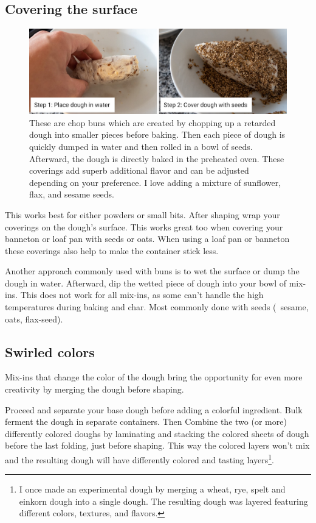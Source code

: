 \subsection{Covering the surface}

\begin{figure}[htb!]
  \centering
  \includegraphics[width=\textwidth]{surface-seeds}
  \caption[Surface seeds]{These are chop buns which are created by chopping
    up a retarded dough into smaller pieces before baking. Then each piece of
    dough is quickly dumped in water and then rolled in a bowl of seeds.
    Afterward, the dough is directly baked in the preheated oven. These
    coverings add superb additional flavor and can be adjusted depending on
    your preference. I love adding a mixture of sunflower, flax, and
    sesame seeds.}%
  \label{fig:surface-seeds}
\end{figure}

This works best for either powders or small bits. After shaping wrap your
coverings on the dough's surface. This works great too when covering your
banneton or loaf pan with seeds or oats. When using a loaf pan or banneton
these coverings also help to make the container stick less.

Another approach commonly used with buns is to wet the surface or dump the
dough in water. Afterward, dip the wetted piece of dough into your bowl of
mix-ins.  This does not work for all mix-ins, as some can't handle the high
temperatures during baking and char. Most commonly done with seeds
(\eg~sesame, oats, flax-seed).

\subsection{Swirled colors}
Mix-ins that change the color of the dough bring the opportunity for even more
creativity by merging the dough before shaping.

Proceed and separate your base dough before adding a colorful ingredient. Bulk
ferment the dough in separate containers. Then Combine the two (or
more) differently colored doughs by laminating and stacking the colored sheets
of dough before the last folding, just before shaping. This way the colored
layers won't mix and the resulting dough will have differently colored and
tasting layers\footnote{I once made an experimental dough by merging a wheat,
rye, spelt and einkorn dough into a single dough. The resulting dough was
layered featuring different colors, textures, and flavors.}.
